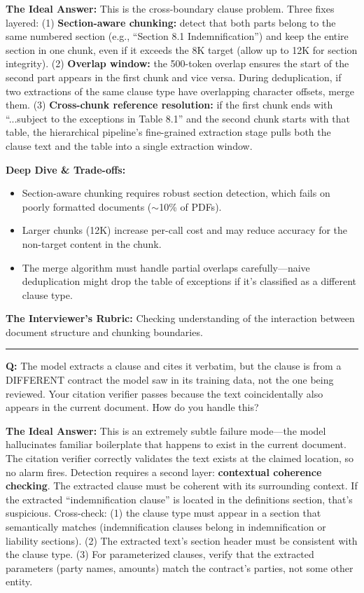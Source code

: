 \textbf{The Ideal Answer:} This is the cross-boundary clause problem. Three fixes layered: (1) \textbf{Section-aware chunking:} detect that both parts belong to the same numbered section (e.g., ``Section 8.1 Indemnification'') and keep the entire section in one chunk, even if it exceeds the 8K target (allow up to 12K for section integrity). (2) \textbf{Overlap window:} the 500-token overlap ensures the start of the second part appears in the first chunk and vice versa. During deduplication, if two extractions of the same clause type have overlapping character offsets, merge them. (3) \textbf{Cross-chunk reference resolution:} if the first chunk ends with ``...subject to the exceptions in Table 8.1'' and the second chunk starts with that table, the hierarchical pipeline's fine-grained extraction stage pulls both the clause text and the table into a single extraction window.

\textbf{Deep Dive \& Trade-offs:}
\begin{itemize}
  \item Section-aware chunking requires robust section detection, which fails on poorly formatted documents ($\sim$10\% of PDFs).
  \item Larger chunks (12K) increase per-call cost and may reduce accuracy for the non-target content in the chunk.
  \item The merge algorithm must handle partial overlaps carefully---naive deduplication might drop the table of exceptions if it's classified as a different clause type.
\end{itemize}

\textbf{The Interviewer's Rubric:} Checking understanding of the interaction between document structure and chunking boundaries.

\bigskip\hrule\bigskip

\textbf{Q:} The model extracts a clause and cites it verbatim, but the clause is from a DIFFERENT contract the model saw in its training data, not the one being reviewed. Your citation verifier passes because the text coincidentally also appears in the current document. How do you handle this?

\textbf{The Ideal Answer:} This is an extremely subtle failure mode---the model hallucinates familiar boilerplate that happens to exist in the current document. The citation verifier correctly validates the text exists at the claimed location, so no alarm fires. Detection requires a second layer: \textbf{contextual coherence checking}. The extracted clause must be coherent with its surrounding context. If the extracted ``indemnification clause'' is located in the definitions section, that's suspicious. Cross-check: (1) the clause type must appear in a section that semantically matches (indemnification clauses belong in indemnification or liability sections). (2) The extracted text's section header must be consistent with the clause type. (3) For parameterized clauses, verify that the extracted parameters (party names, amounts) match the contract's parties, not some other entity.

